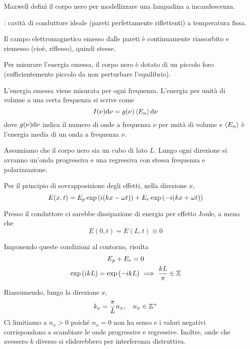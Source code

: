 Maxwell definì il corpo nero per modellizzare una lampadina a incandescenza.

: cavità di conduttore ideale (pareti perfettamente riflettenti) a temperatura fissa.

Il campo elettromagnetico emesso dalle pareti è continuamente riassorbito e riemesso (cioè, riflesso), quindi  stesse.

Per misurare l'energia emessa, il corpo nero è dotato di un piccolo foro (sufficientemente piccolo da non perturbare l'equilibrio).

L'energia emessa viene misurata per ogni frequenza.
L'energia per unità di volume a una certa frequenza si scrive come
\begin{equation}
\label{eq:densita_frequenza}
    I(\nu) \mathrm{d} \nu = g(\nu) \left\langle {E_n} \right\rangle \mathrm{d} \nu
\end{equation}
dove $g(\nu) \mathrm{d} \nu$ indica il numero di onde a frequenza $\nu$ per unità di volume e $\left\langle {E_n} \right\rangle$ è l'energia media di un onda a frequenza $\nu$.

Assumiamo che il corpo nero sia un cubo di lato $L$.
Lungo ogni direzione si avranno un'onda progressiva e una regressiva con stessa frequenza e polarizzazione.

Per il principio di sovrapposizione degli effetti, nella direzione $x$,
\begin{equation}
    E(x, t) = E_p \operatorname{exp}\left( i (k x - \omega t) \right) + E_r \operatorname{exp}\left( -i (k x + \omega t) \right)
\end{equation}

Presso il conduttore ci sarebbe dissipazione di energia per effetto Joule, a meno che
\begin{equation}
    E(0, t) = E(L, t) \equiv 0
\end{equation}

Imponendo queste condizioni al contorno, risulta
\begin{gather}
    E_p + E_r = 0 \\
    \operatorname{exp}\left( i k L \right) = \operatorname{exp}\left( -i k L \right) \implies \frac{k L}{\pi} \in \mathbb{Z}
\end{gather}

Riassumendo, lungo la direzione $x$,
\begin{equation}
    k_x = \frac{\pi}{L} n_x, \quad n_x \in \mathbb{Z}^+
\end{equation}
Ci limitiamo a $n_x > 0$ poiché $n_x = 0$ non ha senso e i valori negativi corrispondono a scambiare le onde progressive e regressive. Inoltre, onde che avessero $k$ diverso si eliderebbero per interferenza distruttiva.

